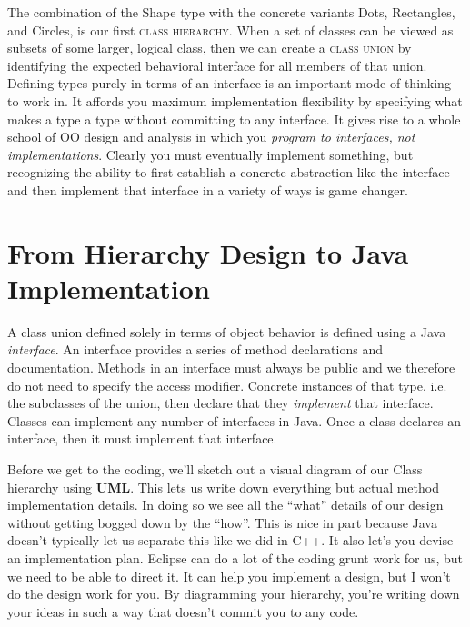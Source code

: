 \documentclass[]{tufte-handout}
\begin{document}
The combination of the Shape type with the concrete variants Dots, Rectangles, and Circles, is our first \textsc{class hierarchy}.  When a set of classes can be viewed as subsets of some larger, logical class, then we can create a \textsc{class union} by identifying the expected behavioral interface for all members of that union. Defining types purely in terms of an interface is an important mode of thinking to work in. It affords you maximum implementation flexibility by specifying what makes a type a type without committing to any interface. It gives rise to a whole school of OO design and analysis in which you \textit{program to interfaces, not implementations}. Clearly you must eventually implement something, but recognizing the ability to first establish a concrete abstraction like the interface and then implement that interface in a variety of ways is game changer. 


\section{From Hierarchy Design to Java Implementation}

A class union defined solely in terms of object behavior is defined using a Java \textit{interface}. An interface provides a series of method declarations and documentation. Methods in an interface must always be public and we therefore do not need to specify the access modifier. Concrete instances of that type, i.e. the subclasses of the union, then declare that they \textit{implement} that interface.  Classes can implement any number of interfaces in Java. Once a class declares an interface, then it must implement that interface.

Before we get to the coding, we'll sketch out a visual diagram of our Class hierarchy using \textbf{UML}. This lets us write down everything but actual method implementation details. In doing so we see all the ``what'' details of our design without getting bogged down by the ``how''.  This is nice in part because Java doesn't typically let us separate this like we did in C++.  It also let's you devise an implementation plan.  Eclipse can do a lot of the coding grunt work for us, but we need to be able to direct it. It can help you implement a design, but I won't do the design work for you. By diagramming your hierarchy, you're writing down your ideas in such a way that doesn't commit you to any code.
\end{document}
